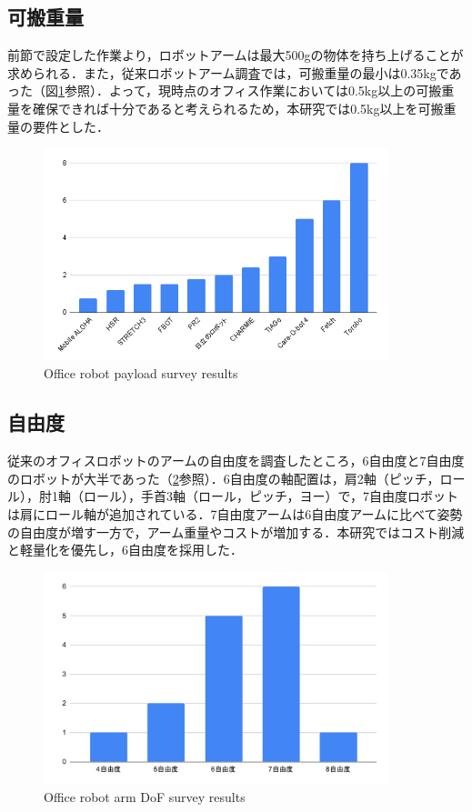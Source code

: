 \subsection{可搬重量}
前節で設定した作業より，ロボットアームは最大500gの物体を持ち上げることが求められる．また，従来ロボットアーム調査では，可搬重量の最小は0.35kgであった（図\ref{fig:payload}参照）．よって，現時点のオフィス作業においては0.5kg以上の可搬重量を確保できれば十分であると考えられるため，本研究では0.5kg以上を可搬重量の要件とした．
\begin{figure}
  \centering
  \includegraphics[width=10cm]{images/2syou/payload.png}
  \caption{Office robot payload survey results}
  \label{fig:payload}
\end{figure}
\clearpage

\subsection{自由度}
従来のオフィスロボットのアームの自由度を調査したところ，6自由度と7自由度のロボットが大半であった（\ref{fig:armDof}参照）．6自由度の軸配置は，肩2軸（ピッチ，ロール），肘1軸（ロール），手首3軸（ロール，ピッチ，ヨー）で，7自由度ロボットは肩にロール軸が追加されている．7自由度アームは6自由度アームに比べて姿勢の自由度が増す一方で，アーム重量やコストが増加する．本研究ではコスト削減と軽量化を優先し，6自由度を採用した．
\begin{figure}[h]
  \centering
  \includegraphics[width=10cm]{images/2syou/armDof.pdf}
  \caption{Office robot arm DoF survey results}
  \label{fig:armDof}
\end{figure}
\clearpage

